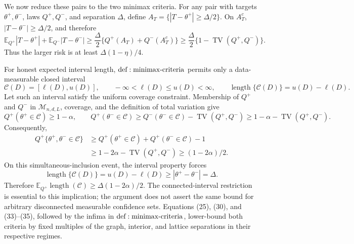 We now reduce these pairs to the two minimax criteria.  For any pair with targets \(\theta^+,\theta^-\), laws \(Q^+,Q^-\), and separation \(\Delta\), define \(A_T=\{|T-\theta^+|\geq\Delta/2\}\).  On \(A_T^c\), \(|T-\theta^-|\geq\Delta/2\), and therefore
\[
 \mathbb E_{Q^+}|T-\theta^+|+\mathbb E_{Q^-}|T-\theta^-|
 \geq\frac\Delta2\{Q^+(A_T)+Q^-(A_T^c)\}
 \geq\frac\Delta2\{1-\operatorname{TV}(Q^+,Q^-)\}.
\tag{34}
\]
Thus the larger risk is at least \(\Delta(1-\eta)/4\).

For honest expected interval length, \({\rm def:minimax\text{-}criteria}\) permits only a data-measurable closed interval
\[
 \mathcal C(D)=[\ell(D),u(D)],
 \qquad -\infty<\ell(D)\leq u(D)<\infty,
 \qquad \operatorname{length}\{\mathcal C(D)\}=u(D)-\ell(D).
\]
Let such an interval satisfy the uniform coverage constraint.  Membership of \(Q^+\) and \(Q^-\) in \(\mathcal M_{n,d,L}\), coverage, and the definition of total variation give
\[
 Q^+(\theta^+\in\mathcal C)\geq1-\alpha,
 \qquad
 Q^+(\theta^-\in\mathcal C)
 \geq Q^-(\theta^-\in\mathcal C)-\operatorname{TV}(Q^+,Q^-)
 \geq1-\alpha-\operatorname{TV}(Q^+,Q^-).
\]
Consequently,
\[
\begin{aligned}
 Q^+\{\theta^+,\theta^-\in\mathcal C\}
 &\geq Q^+(\theta^+\in\mathcal C)+Q^+(\theta^-\in\mathcal C)-1\\
 &\geq1-2\alpha-\operatorname{TV}(Q^+,Q^-)
 \geq(1-2\alpha)/2.
\end{aligned}
\tag{35}
\]
On this simultaneous-inclusion event, the interval property forces
\[
 \operatorname{length}\{\mathcal C(D)\}
 =u(D)-\ell(D)\geq|\theta^+-\theta^-|=\Delta.
\]
Therefore \(\mathbb E_{Q^+}\operatorname{length}(\mathcal C)\geq\Delta(1-2\alpha)/2\).  The connected-interval restriction is essential to this implication; the argument does not assert the same bound for arbitrary disconnected measurable confidence sets.  Equations (25), (30), and (33)--(35), followed by the infima in \({\rm def:minimax\text{-}criteria}\), lower-bound both criteria by fixed multiples of the graph, interior, and lattice separations in their respective regimes.

